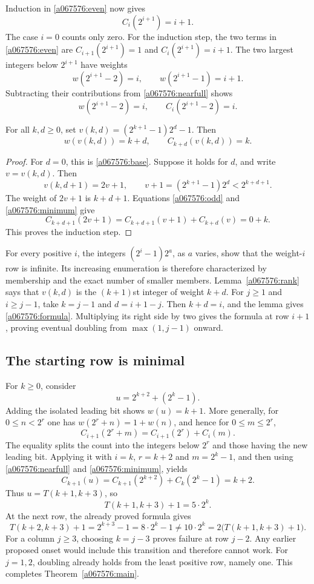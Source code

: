 Induction in \eqref{a067576:even} now gives
\begin{equation}\label{a067576:nearfull}
 C_i(2^{i+1})=i+1.
\end{equation}
The case $i=0$ counts only zero. For the induction step, the two terms
in \eqref{a067576:even} are $C_{i+1}(2^{i+1})=1$ and
$C_i(2^{i+1})=i+1$. The two largest integers below $2^{i+1}$ have
weights
\[
 w(2^{i+1}-2)=i,\qquad w(2^{i+1}-1)=i+1.
\]
Subtracting their contributions from \eqref{a067576:nearfull} shows
\begin{equation}\label{a067576:base}
 w(2^{i+1}-2)=i,\qquad C_i(2^{i+1}-2)=i.
\end{equation}

\begin{lemma}\label{a067576:rank}
For all $k,d\ge0$, set $v(k,d)=(2^{k+1}-1)2^d-1$. Then
\[
 w(v(k,d))=k+d,\qquad C_{k+d}(v(k,d))=k.
\]
\end{lemma}
\begin{proof}
For $d=0$, this is \eqref{a067576:base}. Suppose it holds for $d$,
and write $v=v(k,d)$. Then
\[
 v(k,d+1)=2v+1,\qquad
 v+1=(2^{k+1}-1)2^d<2^{k+d+1}.
\]
The weight of $2v+1$ is $k+d+1$. Equations
\eqref{a067576:odd} and \eqref{a067576:minimum} give
\[
 C_{k+d+1}(2v+1)
 =C_{k+d+1}(v+1)+C_{k+d}(v)=0+k.
\]
This proves the induction step.
\end{proof}

For every positive $i$, the integers $(2^i-1)2^a$, as $a$ varies, show
that the weight-$i$ row is infinite. Its increasing enumeration is
therefore characterized by membership and the exact number of smaller
members. Lemma~\ref{a067576:rank} says that $v(k,d)$ is the $(k+1)$st
integer of weight $k+d$. For $j\ge1$ and $i\ge j-1$, take
$k=j-1$ and $d=i+1-j$. Then $k+d=i$, and the lemma gives
\eqref{a067576:formula}. Multiplying its right side by two gives the
formula at row $i+1$, proving eventual doubling from
$\max(1,j-1)$ onward.

\subsection*{The starting row is minimal}
For $k\ge0$, consider
\[
 u=2^{k+2}+(2^k-1).
\]
Adding the isolated leading bit shows $w(u)=k+1$. More generally, for
$0\le n<2^r$ one has $w(2^r+n)=1+w(n)$, and hence for
$0\le m\le2^r$,
\begin{equation}\label{a067576:leading}
 C_{i+1}(2^r+m)=C_{i+1}(2^r)+C_i(m).
\end{equation}
The equality splits the count into the integers below $2^r$ and those
having the new leading bit. Applying it with $i=k$, $r=k+2$ and
$m=2^k-1$, and then using \eqref{a067576:nearfull} and
\eqref{a067576:minimum}, yields
\[
 C_{k+1}(u)=C_{k+1}(2^{k+2})+C_k(2^k-1)=k+2.
\]
Thus $u=T(k+1,k+3)$, so
\[
 T(k+1,k+3)+1=5\cdot2^k.
\]
At the next row, the already proved formula gives
\[
 T(k+2,k+3)+1=2^{k+3}-1=8\cdot2^k-1
 \ne10\cdot2^k=2\bigl(T(k+1,k+3)+1\bigr).
\]
For a column $j\ge3$, choosing $k=j-3$ proves failure at row $j-2$.
Any earlier proposed onset would include this transition and therefore
cannot work. For $j=1,2$, doubling already holds from the least positive
row, namely one. This completes Theorem~\ref{a067576:main}.

